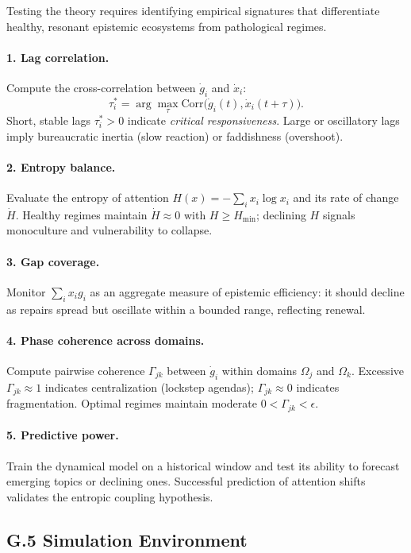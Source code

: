 \documentclass[11pt,a4paper,titlepage]{article}
\theoremstyle{definition}
\begin{document}
\begin{itemize}
Testing the theory requires identifying empirical signatures that differentiate healthy, resonant epistemic ecosystems from pathological regimes.

\paragraph{1. Lag correlation.}
Compute the cross-correlation between $\dot g_i$ and $\dot x_i$:
\[
\tau_i^\ast = \arg\max_\tau \text{Corr}\big(\dot g_i(t), \dot x_i(t+\tau)\big).
\]
Short, stable lags $\tau_i^\ast>0$ indicate \emph{critical responsiveness}.
Large or oscillatory lags imply bureaucratic inertia (slow reaction) or faddishness (overshoot).

\paragraph{2. Entropy balance.}
Evaluate the entropy of attention $H(x)=-\sum_i x_i\log x_i$ and its rate of change $\dot H$.
Healthy regimes maintain $\dot H\!\approx\!0$ with $H\!\ge\!H_{\min}$; declining $H$ signals
monoculture and vulnerability to collapse.

\paragraph{3. Gap coverage.}
Monitor $\sum_i x_i g_i$ as an aggregate measure of epistemic efficiency:
it should decline as repairs spread but oscillate within a bounded range, reflecting renewal.

\paragraph{4. Phase coherence across domains.}
Compute pairwise coherence $\Gamma_{jk}$ between $\dot g_i$ within domains $\Omega_j$ and $\Omega_k$.
Excessive $\Gamma_{jk}\!\approx\!1$ indicates centralization (lockstep agendas);
$\Gamma_{jk}\!\approx\!0$ indicates fragmentation.
Optimal regimes maintain moderate $0<\Gamma_{jk}<\epsilon$.

\paragraph{5. Predictive power.}
Train the dynamical model on a historical window and test its ability to forecast emerging topics or declining ones.
Successful prediction of attention shifts validates the entropic coupling hypothesis.

\subsection*{G.5 Simulation Environment}


\end{itemize}
\end{document}
